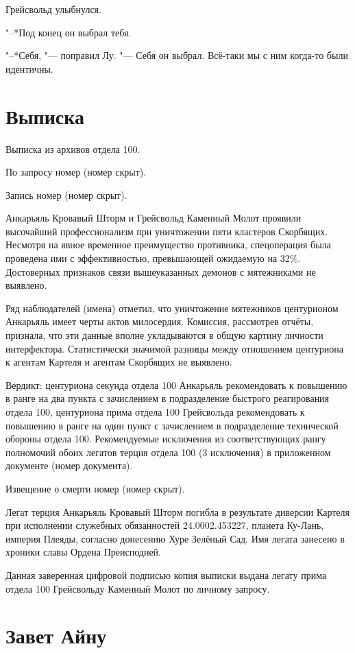 \documentclass[a4paper,10pt]{book}
\begin{document}
Грейсвольд улыбнулся.

"--*Под конец он выбрал тебя.

"--*Себя, "--- поправил Лу. "--- Себя он выбрал. Всё-таки мы с ним когда-то были идентичны.

\section{Выписка}

Выписка из архивов отдела 100.

По запросу номер (номер скрыт).

Запись номер (номер скрыт).

Анкарьяль Кровавый Шторм и Грейсвольд Каменный Молот проявили высочайший 
профессионализм при уничтожении пяти кластеров Скорбящих. Несмотря на явное 
временное преимущество противника, спецоперация была проведена ими с 
эффективностью, превышающей ожидаемую на 32\%. Достоверных признаков связи 
вышеуказанных демонов с мятежниками не выявлено.

Ряд наблюдателей (имена) отметил, что уничтожение мятежников центурионом 
Анкарьяль имеет черты актов милосердия. Комиссия, рассмотрев отчёты, признала, 
что эти данные вполне укладываются в общую картину личности интерфектора. 
Статистически значимой разницы между отношением центуриона к агентам Картеля и 
агентам Скорбящих не выявлено.

Вердикт: центуриона секунда отдела 100 Анкарьяль рекомендовать к повышению в 
ранге на два пункта с зачислением в подразделение быстрого реагирования отдела 
100, центуриона прима отдела 100 Грейсвольда рекомендовать к повышению в ранге 
на один пункт с зачислением в подразделение технической обороны отдела 100. 
Рекомендуемые исключения из соответствующих рангу полномочий обоих легатов 
терция отдела 100 (3 исключения) в приложенном документе (номер документа).

Извещение о смерти номер (номер скрыт).

Легат терция Анкарьяль Кровавый Шторм погибла в результате диверсии Картеля при 
исполнении служебных обязанностей 24.0002.453227, планета Ку-Лань, империя 
Плеяды, согласно донесению Хуре Зелёный Сад. Имя легата занесено в хроники 
славы Ордена Преисподней.

Данная заверенная цифровой подписью копия выписки выдана легату прима отдела 
100 Грейсвольду Каменный Молот по личному запросу.

\section{Завет Айну}
\end{document}
